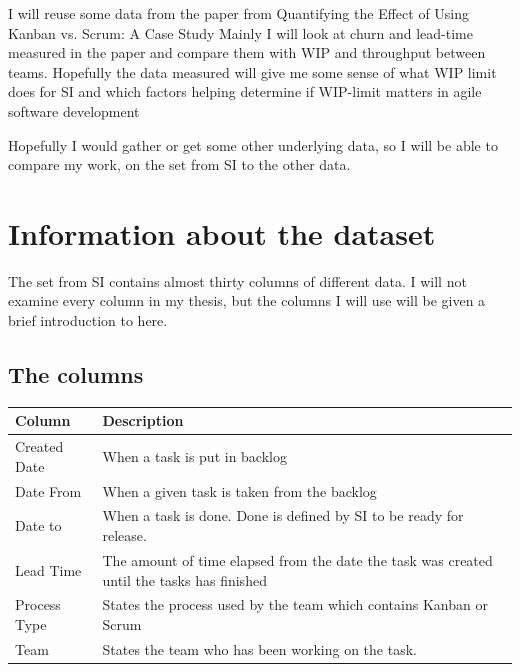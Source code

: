 \documentclass[UKenglish]{ifimaster}  %
\begin{document}
I will reuse some data from the paper from Quantifying the Effect of Using Kanban vs. Scrum: A Case Study \parencite{Dag} Mainly I will look at churn and lead-time measured in the paper and compare them with WIP and throughput between teams. Hopefully the data measured will give me some sense of what WIP limit does for SI and which factors helping determine if WIP-limit matters in agile software development

Hopefully I would gather or get some other underlying data, so I will be able to compare my work, on the set from SI to the other data.

\section{Information about the dataset}
The set from SI contains almost thirty columns of different data. I will not examine every column in my thesis, but the columns I will use will be given a brief introduction to here.
\newpage
\subsection{The columns}
\begin{center}
    \begin{tabular}{| l | p{5cm} |}
    \hline
     Column & Description\\ \hline
     Created Date & When a task is put in backlog \\ \hline
     Date From & When a given task is taken from the backlog\\ \hline
     Date to & When a task is done. Done is defined by SI to be ready for release. \\ \hline
    Lead Time & The amount of time elapsed from the date the task was created until the tasks has finished  \\ \hline
   Process Type &States the process used by the team which contains Kanban or Scrum \\
    \hline
    Team &States the team who has been working on the task.\\ \hline
    \end{tabular}
\end{center}
\end{document}
